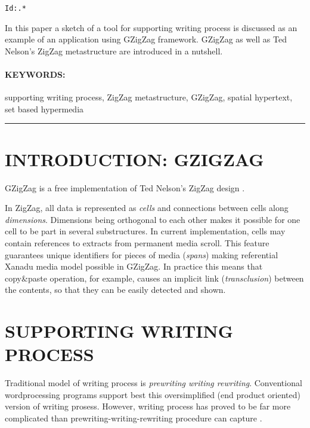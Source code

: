 \ifdraft
\begin{verbatim}
Id:.*
\end{verbatim}
\fi

\abstract
In this paper a sketch of a tool for supporting writing process is discussed 
as an example of an application using GZigZag framework.
GZigZag as well as Ted Nelson's ZigZag metastructure are introduced in 
a nutshell.

\paragraph{KEYWORDS:} supporting writing process, ZigZag metastructure, 
GZigZag, spatial hypertext, set based hypermedia 
\ifdraft
\vfill

\break
\tableofcontents

\hrule
{}
\fi

\section{INTRODUCTION: GZIGZAG}


GZigZag \cite{gzigzag} is a free \cite{GNU}
implementation of Ted Nelson's ZigZag design
\cite{zigzag-manual,zigzag-presentation,zigzag-welcome}.

In ZigZag, all data is represented as {\em cells} and connections
between cells along {\em dimensions}. 
Dimensions being orthogonal to each other makes it possible for one cell 
to be part in several substructures. 
In current implementation,
cells may contain references to extracts from permanent media scroll.
This feature guarantees unique identifiers for pieces of media 
({\em spans}) making referential Xanadu media model
\cite{literary-machines-931} possible in GZigZag. In practice
this means that copy\&paste operation, for example, causes an implicit link 
({\em transclusion}) between the contents, so that they can be easily detected and shown.  

\section{SUPPORTING WRITING PROCESS}
Traditional model of writing process is 
{\em prewriting \ra writing \ra rewriting}. Conventional wordprocessing 
programs support best this oversimplified (end product oriented) version of 
writing prosess. However, writing process has proved to be far more 
complicated than prewriting-writing-rewriting procedure can capture
\cite{hayes-flower86writing-research-and-the-writer}.

